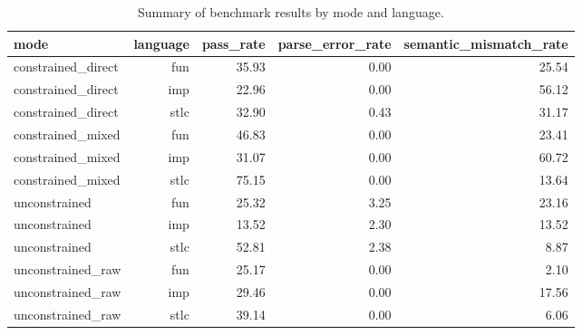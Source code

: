 \begin{table}[htbp]
  \centering
  \caption{Summary of benchmark results by mode and language.}
  \label{tab:summary_mode_lang}
  \begin{tabular}{lrrrr}
    \toprule
    mode & language & pass\_rate & parse\_error\_rate & semantic\_mismatch\_rate \\
    \midrule
    constrained\_direct & fun & 35.93 & 0.00 & 25.54 \\
    constrained\_direct & imp & 22.96 & 0.00 & 56.12 \\
    constrained\_direct & stlc & 32.90 & 0.43 & 31.17 \\
    constrained\_mixed & fun & 46.83 & 0.00 & 23.41 \\
    constrained\_mixed & imp & 31.07 & 0.00 & 60.72 \\
    constrained\_mixed & stlc & 75.15 & 0.00 & 13.64 \\
    unconstrained & fun & 25.32 & 3.25 & 23.16 \\
    unconstrained & imp & 13.52 & 2.30 & 13.52 \\
    unconstrained & stlc & 52.81 & 2.38 & 8.87 \\
    unconstrained\_raw & fun & 25.17 & 0.00 & 2.10 \\
    unconstrained\_raw & imp & 29.46 & 0.00 & 17.56 \\
    unconstrained\_raw & stlc & 39.14 & 0.00 & 6.06 \\
    \bottomrule
  \end{tabular}
\end{table}